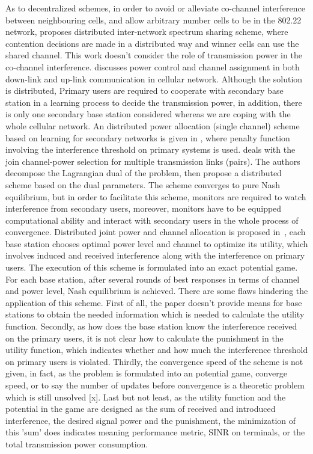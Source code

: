 As to decentralized schemes, in order to avoid or alleviate co-channel interference between neighbouring cells, and allow arbitrary number cells to be in the 802.22 network, \cite{Inter-Network_Spectrum_Sharing_80222_08} proposes distributed inter-network spectrum sharing scheme, where contention decisions are made in a distributed way and winner cells can use the shared channel.
This work doesn't consider the role of transmission power in the co-channel interference.
\cite{HoangPowerChannel2010} discusses power control and channel assignment in both down-link and up-link communication in cellular network. 
Although the solution is distributed, Primary users are required to cooperate with secondary base station in a learning process to decide the transmission power, in addition, there is only one secondary base station considered whereas we are coping with the whole cellular network. 
An distributed power allocation (single channel) scheme based on learning for secondary networks is given in \cite{aggregatedInf_Galindo_crowncom09}, where penalty function involving the interference threshold on primary systems is used.
\cite{wuinfocom09} deals with the join channel-power selection for multiple transmission links (pairs). 
The authors decompose the Lagrangian dual of the problem, then propose a distributed scheme based on the dual parameters. 
The scheme converges to pure Nash equilibrium, but in order to facilitate this scheme, monitors are required to watch interference from secondary users, moreover, monitors have to be equipped computational ability and interact with secondary users in the whole process of convergence.
Distributed joint power and channel allocation is proposed in~\cite{pimrc_2012}, each base station chooses optimal power level and channel to optimize its utility, which involves induced and received interference along with the interference on primary users. 
The execution of this scheme is formulated into an exact potential game. 
For each base station, after several rounds of best responses in terms of channel and power level, Nash equilibrium is achieved.
There are some flaws hindering the application of this scheme.
First of all, the paper doesn't provide means for base stations to obtain the needed information which is needed to calculate the utility function.
Secondly, as how does the base station know the interference received on the primary users, it is not clear how to calculate the punishment in the utility function, which indicates whether and how much the interference threshold on primary users is violated.
Thirdly, the convergence speed of the scheme is not given, in fact, as the problem is formulated into an potential game, converge speed, or to say the number of updates before convergence is a theoretic problem which is still unsolved [x].
Last but not least, as the utility function and the potential in the game are designed as the sum of received and introduced interference, the desired signal power and the punishment, the minimization of this 'sum' does indicates meaning  performance metric, \ie SINR on terminals, or the total transmission power consumption.

